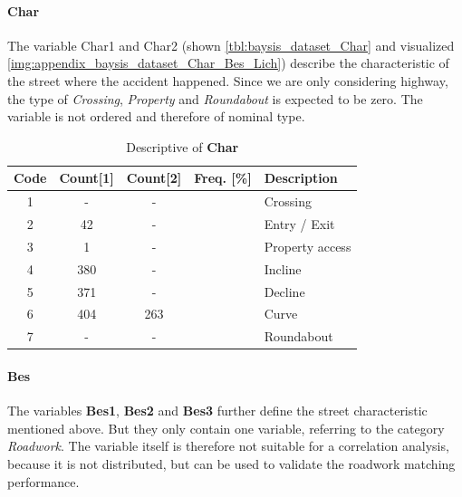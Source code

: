 \paragraph{Char}
\label{baysis_dataset_Char}
The variable Char1 and Char2 (shown \autoref{tbl:baysis_dataset_Char} and visualized \autoref{img:appendix_baysis_dataset_Char_Bes_Lich}) describe the characteristic of the street where the accident happened. Since we are only considering highway, the type of \textit{Crossing}, \textit{Property} and \textit{Roundabout} is expected to be zero. The variable is not ordered and therefore of nominal type.  
\begin{table}[ht]
	\centering
	\small
	\begin{tabular}{c|c|c|c|l}
		\toprule
		Code & Count[1] & Count[2] & Freq. [\%] & Description \\ 
		\midrule
		1 & - 	& -		&	& Crossing \\
	    2 & 42	& -		&	& Entry / Exit \\
	    3 & 1	& -		&	& Property access \\
	    4 & 380	& -		&	& Incline \\
	    5 & 371	& -		&	& Decline \\
	    6 & 404	& 263	&	& Curve \\
		7 & -	& -		&	& Roundabout \\
		\bottomrule
	\end{tabular}
	\caption{Descriptive of \textbf{Char}}
	\label{tbl:baysis_dataset_Char}
	\vspace{-8mm}
\end{table}

\paragraph{Bes}
\label{baysis_dataset_Bes}
The variables \textbf{Bes1}, \textbf{Bes2} and \textbf{Bes3} further define the street characteristic mentioned above. But they only contain one variable, referring to the category \textit{Roadwork}. The variable itself is therefore not suitable for a correlation analysis, because it is not distributed, but can be used to validate the roadwork matching performance.

